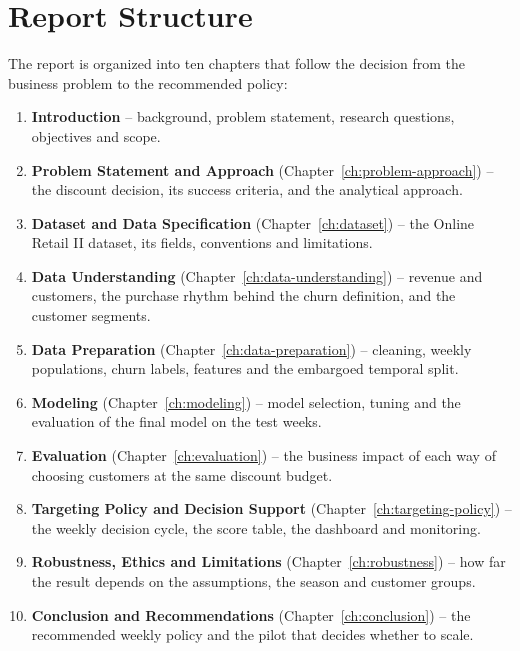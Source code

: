 \section{Report Structure}
\label{sec:1-6}

The report is organized into ten chapters that follow the decision from the business problem to the recommended policy:

\begin{enumerate}
    \item \textbf{Introduction} -- background, problem statement, research questions, objectives and scope.
    \item \textbf{Problem Statement and Approach} (Chapter~\ref{ch:problem-approach}) -- the discount decision, its success criteria, and the analytical approach.
    \item \textbf{Dataset and Data Specification} (Chapter~\ref{ch:dataset}) -- the Online Retail II dataset, its fields, conventions and limitations.
    \item \textbf{Data Understanding} (Chapter~\ref{ch:data-understanding}) -- revenue and customers, the purchase rhythm behind the churn definition, and the customer segments.
    \item \textbf{Data Preparation} (Chapter~\ref{ch:data-preparation}) -- cleaning, weekly populations, churn labels, features and the embargoed temporal split.
    \item \textbf{Modeling} (Chapter~\ref{ch:modeling}) -- model selection, tuning and the evaluation of the final model on the test weeks.
    \item \textbf{Evaluation} (Chapter~\ref{ch:evaluation}) -- the business impact of each way of choosing customers at the same discount budget.
    \item \textbf{Targeting Policy and Decision Support} (Chapter~\ref{ch:targeting-policy}) -- the weekly decision cycle, the score table, the dashboard and monitoring.
    \item \textbf{Robustness, Ethics and Limitations} (Chapter~\ref{ch:robustness}) -- how far the result depends on the assumptions, the season and customer groups.
    \item \textbf{Conclusion and Recommendations} (Chapter~\ref{ch:conclusion}) -- the recommended weekly policy and the pilot that decides whether to scale.
\end{enumerate}
